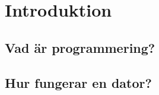
\chapter{Introduktion}

\section{Vad är programmering?}
\lipsum

\section{Hur fungerar en dator?}
\lipsum




